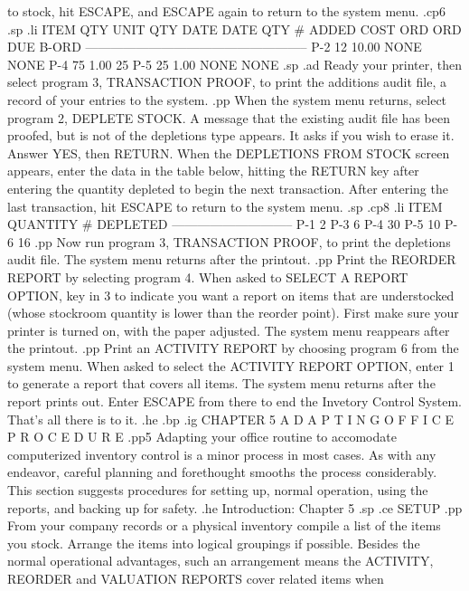 to stock, hit ESCAPE, and ESCAPE again to return to the system menu.
.cp6
.sp
.li
    ITEM    QTY      UNIT    QTY   DATE     DATE    QTY
     #	   ADDED     COST    ORD   ORD	    DUE    B-ORD
    -----------------------------------------------------
    P-2     12	    10.00	   NONE     NONE
    P-4     75	     1.00			     25
    P-5     25	     1.00	   NONE     NONE
.sp
.ad
Ready your printer, then select program 3, TRANSACTION PROOF, to print
the additions audit file, a record of your entries to the system.
.pp
When the system menu returns, select program 2, DEPLETE STOCK.	A
message that the existing audit file has been proofed, but is not of
the depletions type appears.  It asks if you wish to erase it.	Answer
YES, then RETURN.  When the DEPLETIONS FROM STOCK screen appears, enter
the data in the table below, hitting the RETURN key after entering the quantity
depleted to begin the next transaction.
After entering
the last transaction, hit ESCAPE to return to the system menu.
.sp
.cp8
.li
	ITEM	       QUANTITY
	 #	       DEPLETED
     -----------------------------
	P-1		  2
	P-3		  6
	P-4		 30
	P-5		 10
	P-6		 16
.pp
Now run program 3, TRANSACTION PROOF, to print the depletions audit file.
The system menu returns after the printout.
.pp
Print the REORDER REPORT by selecting program 4.  When asked to SELECT A
REPORT OPTION, key in 3 to indicate you want a report on items that
are understocked (whose stockroom quantity is lower than the reorder point).
First make sure your printer is turned on, with the paper adjusted.  The
system menu reappears after the printout.
.pp
Print an ACTIVITY REPORT by choosing program 6 from the system menu.
When asked to select the ACTIVITY REPORT OPTION, enter 1 to generate
a report that covers all items.  The system menu returns after the
report prints out.  Enter ESCAPE from there to end the Invetory Control
System.  That's all there is to it.
.he
.bp
.ig
CHAPTER 5
A D A P T I N G    O F F I C E	  P R O C E D U R E
.pp5
Adapting your office routine to accomodate computerized inventory control
is a minor process in most cases.  As with any endeavor, careful planning
and forethought smooths the process considerably.
This section suggests procedures for setting up, normal operation, using
the reports, and backing up for safety.
.he Introduction: Chapter 5
.sp
.ce
SETUP
.pp
From your company records or a physical inventory compile a list of the
items
you stock.  Arrange the items into logical groupings if possible.
Besides the normal operational advantages, such an arrangement means
the ACTIVITY, REORDER and VALUATION REPORTS cover related items when
